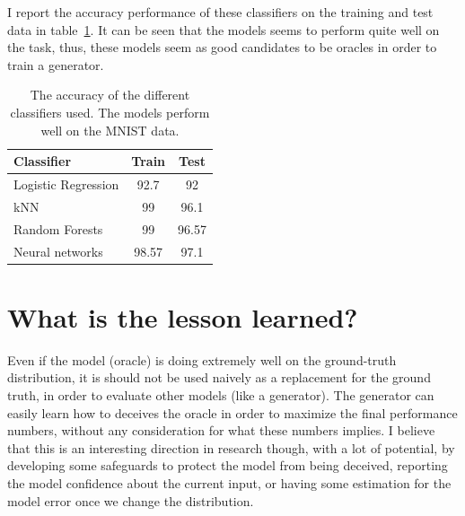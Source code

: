   \par I report the accuracy performance of these classifiers on the training and test data in table~\ref{tbl:classifier_performance}. It can be seen that the models seems to perform quite well on the task, thus, these models seem as good candidates to be oracles in order to train a generator.

  \begin{table}
    \centering
    \begin{tabular}{l c c} \hline
      Classifier & Train & Test \\ \hline
      Logistic Regression & 92.7 &  92 \\ %
      kNN & 99 & 96.1 \\ %
      Random Forests & 99 & 96.57 \\ %
      Neural networks & 98.57 & 97.1 \\ \hline
    \end{tabular}
    \caption{The accuracy of the different classifiers used. The models perform well on the MNIST data.}
    \label{tbl:classifier_performance}
  \end{table}

\section{What is the lesson learned?}
  \par Even if the model (oracle) is doing extremely well on the ground-truth distribution, it is should not be used naively as a replacement for the ground truth, in order to evaluate other models (like a generator). The generator can easily learn how to deceives the oracle in order to maximize the final performance numbers, without any consideration for what these numbers implies. I believe that this is an interesting direction in research though, with a lot of potential, by developing some safeguards to protect the model from being deceived, reporting the model confidence about the current input, or having some estimation for the model error once we change the distribution.
